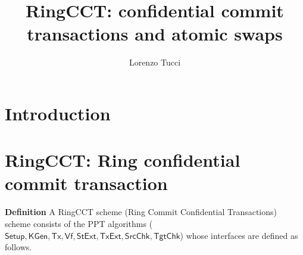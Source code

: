 \documentclass{article}      	%
\begin{document}
         
\author{Lorenzo Tucci}
\title{RingCCT: confidential commit transactions and atomic swaps}

\maketitle

\tableofcontents
\newpage

\section{Introduction}
\section{RingCCT: Ring confidential commit transaction}

\textbf{Definition} A RingCCT scheme (Ring Commit Confidential Transactions) scheme consists of the PPT algorithms ($\mathsf{Setup,KGen,Tx,Vf,StExt,TxExt,SrcChk,TgtChk}$) whose interfaces are defined as follows.
\end{document}
